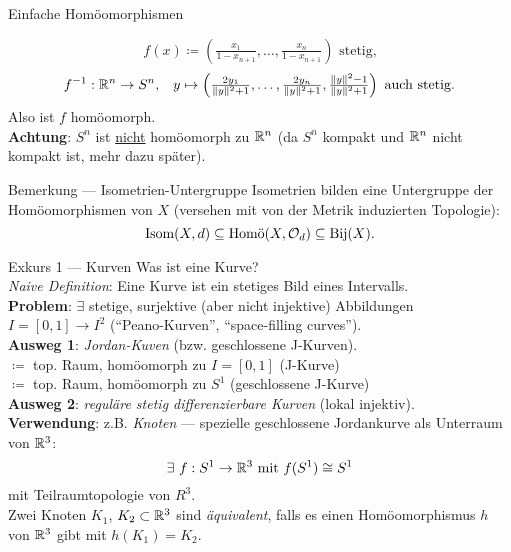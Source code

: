 \begin{example}{Einfache Homöomorphismen}
\begin{itemize}
\begin{equation*}
      \end{equation*}
      \begin{equation*}
        f(x) \coloneqq (\tfrac{x_1}{1-x_{n+1}}, \dots, \tfrac{x_n}{1-x_{n+1}}) \text{ stetig,}
      \end{equation*}
      \begin{equation*}
        f^{-1}: \mathbb{R}^n \to S^n\text{,} \quad y \mapsto \left( \tfrac{2y_1}{\Vert y \Vert^2+1}, \dots, \tfrac{2y_n}{\Vert y \Vert^2+1}, \tfrac{\Vert y \Vert^2-1}{\Vert y \Vert^2+1} \right)\text{ auch stetig.}
      \end{equation*}
      Also ist $ f $ homöomorph. \\
      \textbf{Achtung}: $ S^n $ ist \underline{nicht} homöomorph zu $ \mathbb{R}^n $ (da $ S^n $ kompakt und $ \mathbb{R}^n $ nicht kompakt ist, mehr dazu später).
  \end{itemize}
\end{example}

\begin{bla}{Bemerkung --- Isometrien-Untergruppe}
  Isometrien bilden eine Untergruppe der Homöomorphismen von $ X $ (versehen mit von der Metrik induzierten Topologie):
  \begin{equation*}
    \text{Isom}(X, d) \subseteq \text{Homö}(X, \mathcal{O}_d) \subseteq \text{Bij}(X)\text{.}
  \end{equation*}
\end{bla}

\begin{bla}{Exkurs 1 --- Kurven}
  Was ist eine Kurve? \\
  \emph{Naive Definition}: Eine Kurve ist ein stetiges Bild eines Intervalls. \\
  \textbf{Problem}: $ \exists $ stetige, surjektive (aber nicht injektive) Abbildungen $ I = [0,1] \to I^2 $ (``Peano-Kurven'', ``space-filling curves''). \\
  \textbf{Ausweg 1}: \emph{Jordan-Kuven} (bzw. geschlossene J-Kurven). \\
    $ \coloneqq $ top. Raum, homöomorph zu $ I = [0,1] $ (J-Kurve) \\
    $ \coloneqq $ top. Raum, homöomorph zu $ S^1 $ (geschlossene J-Kurve) \\
  \textbf{Ausweg 2}: \emph{reguläre stetig differenzierbare Kurven} (lokal injektiv). \\
  \textbf{Verwendung}: z.B. \emph{Knoten} --- spezielle geschlossene Jordankurve als Unterraum von $ \mathbb{R}^3 $:
  \begin{equation*}
    \exists \ f : S^1 \to \mathbb{R}^3 \text{ mit } f(S^1) \cong S^1
  \end{equation*}
  mit Teilraumtopologie von $ R^3 $. \\
  Zwei Knoten $ K_1 $, $ K_2 \subset \mathbb{R}^3 $ sind \emph{äquivalent}, falls es einen Homöomorphismus $ h $ von $ \mathbb{R}^3 $ gibt mit $ h(K_1) = K_2 $.
\end{bla}


